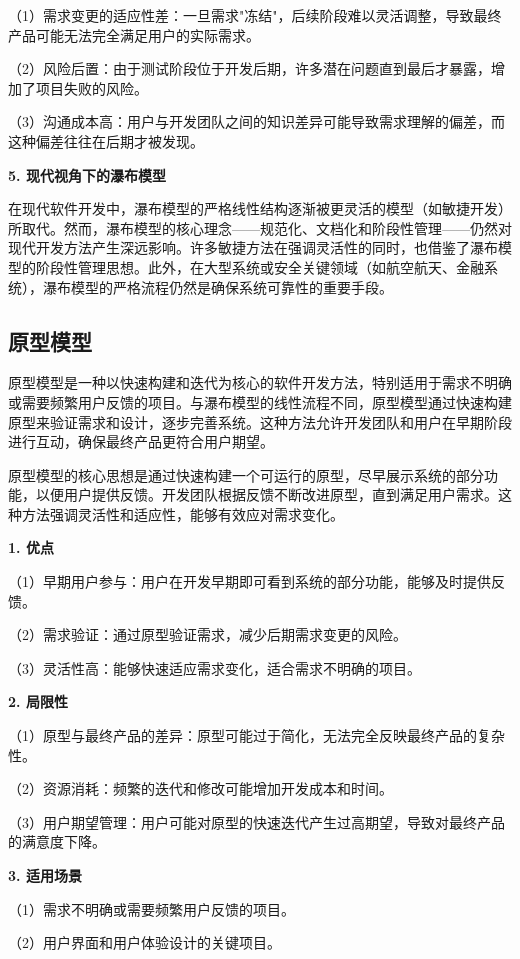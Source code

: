 （1）需求变更的适应性差：一旦需求"冻结"，后续阶段难以灵活调整，导致最终产品可能无法完全满足用户的实际需求。

（2）风险后置：由于测试阶段位于开发后期，许多潜在问题直到最后才暴露，增加了项目失败的风险。

（3）沟通成本高：用户与开发团队之间的知识差异可能导致需求理解的偏差，而这种偏差往往在后期才被发现。

\textbf{5. 现代视角下的瀑布模型}

在现代软件开发中，瀑布模型的严格线性结构逐渐被更灵活的模型（如敏捷开发）所取代。然而，瀑布模型的核心理念——规范化、文档化和阶段性管理——仍然对现代开发方法产生深远影响。许多敏捷方法在强调灵活性的同时，也借鉴了瀑布模型的阶段性管理思想。此外，在大型系统或安全关键领域（如航空航天、金融系统），瀑布模型的严格流程仍然是确保系统可靠性的重要手段。

\subsection{原型模型}

原型模型是一种以快速构建和迭代为核心的软件开发方法，特别适用于需求不明确或需要频繁用户反馈的项目。与瀑布模型的线性流程不同，原型模型通过快速构建原型来验证需求和设计，逐步完善系统。这种方法允许开发团队和用户在早期阶段进行互动，确保最终产品更符合用户期望。

原型模型的核心思想是通过快速构建一个可运行的原型，尽早展示系统的部分功能，以便用户提供反馈。开发团队根据反馈不断改进原型，直到满足用户需求。这种方法强调灵活性和适应性，能够有效应对需求变化。

\textbf{1. 优点}

（1）早期用户参与：用户在开发早期即可看到系统的部分功能，能够及时提供反馈。

（2）需求验证：通过原型验证需求，减少后期需求变更的风险。

（3）灵活性高：能够快速适应需求变化，适合需求不明确的项目。

\textbf{2. 局限性}

（1）原型与最终产品的差异：原型可能过于简化，无法完全反映最终产品的复杂性。

（2）资源消耗：频繁的迭代和修改可能增加开发成本和时间。

（3）用户期望管理：用户可能对原型的快速迭代产生过高期望，导致对最终产品的满意度下降。

\textbf{3. 适用场景}

（1）需求不明确或需要频繁用户反馈的项目。

（2）用户界面和用户体验设计的关键项目。

